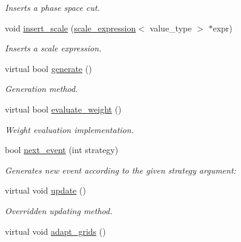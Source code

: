 \begin{DoxyCompactItemize}
\begin{DoxyCompactList}\small\item\em Inserts a phase space cut. \end{DoxyCompactList}\item 
\hypertarget{a00450_ad133fd61045d27c616d33b595833356d}{}void \hyperlink{a00450_ad133fd61045d27c616d33b595833356d}{insert\+\_\+scale} (\hyperlink{a00502}{scale\+\_\+expression}$<$ value\+\_\+type $>$ $\ast$expr)\label{a00450_ad133fd61045d27c616d33b595833356d}

\begin{DoxyCompactList}\small\item\em Inserts a scale expression. \end{DoxyCompactList}\item 
\hypertarget{a00450_ab73a5fc08e805563cef84e20f711c569}{}virtual bool \hyperlink{a00450_ab73a5fc08e805563cef84e20f711c569}{generate} ()\label{a00450_ab73a5fc08e805563cef84e20f711c569}

\begin{DoxyCompactList}\small\item\em Generation method. \end{DoxyCompactList}\item 
\hypertarget{a00450_a343e559081cd2b9311cde0683f045295}{}virtual bool \hyperlink{a00450_a343e559081cd2b9311cde0683f045295}{evaluate\+\_\+weight} ()\label{a00450_a343e559081cd2b9311cde0683f045295}

\begin{DoxyCompactList}\small\item\em Weight evaluation implementation. \end{DoxyCompactList}\item 
\hypertarget{a00450_a4f6c2d0ebb8881183176df28e205a64f}{}bool \hyperlink{a00450_a4f6c2d0ebb8881183176df28e205a64f}{next\+\_\+event} (int strategy)\label{a00450_a4f6c2d0ebb8881183176df28e205a64f}

\begin{DoxyCompactList}\small\item\em Generates new event according to the given strategy argument\+: \end{DoxyCompactList}\item 
\hypertarget{a00450_a9d2e16d1e0de49a4dc9fcc75ba3592d9}{}virtual void \hyperlink{a00450_a9d2e16d1e0de49a4dc9fcc75ba3592d9}{update} ()\label{a00450_a9d2e16d1e0de49a4dc9fcc75ba3592d9}

\begin{DoxyCompactList}\small\item\em Overridden updating method. \end{DoxyCompactList}\item 
\hypertarget{a00450_a8dadcf764ebcfca1e05156866e24f81c}{}virtual void \hyperlink{a00450_a8dadcf764ebcfca1e05156866e24f81c}{adapt\+\_\+grids} ()\label{a00450_a8dadcf764ebcfca1e05156866e24f81c}


\end{DoxyCompactItemize}
